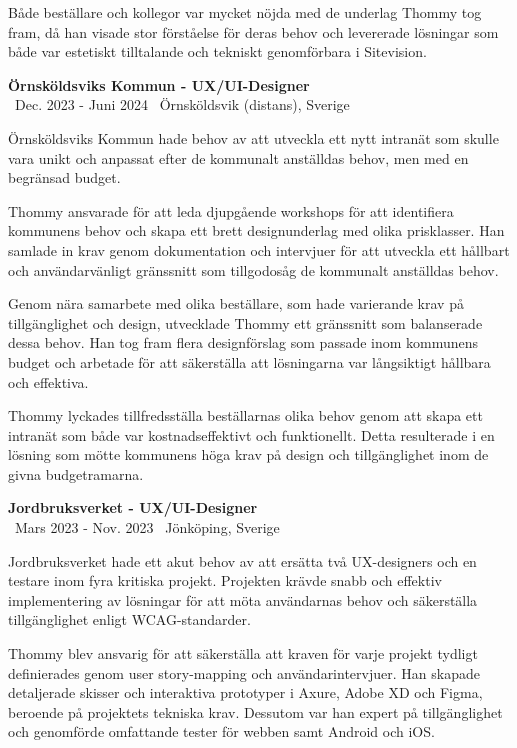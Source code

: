 \documentclass[a4paper,10pt]{article}
\begin{document}
Både beställare och kollegor var mycket nöjda med de underlag Thommy tog fram, då han visade stor förståelse för deras behov och levererade lösningar som både var estetiskt tilltalande och tekniskt genomförbara i Sitevision.

\vspace{0.5cm}
\textbf{Örnsköldsviks Kommun - UX/UI-Designer}\\
\normalsize \faCalendar \ Dec. 2023 - Juni 2024 \quad \faMapMarker \ Örnsköldsvik (distans), Sverige

Örnsköldsviks Kommun hade behov av att utveckla ett nytt intranät som skulle vara unikt och anpassat efter de kommunalt anställdas behov, men med en begränsad budget.

Thommy ansvarade för att leda djupgående workshops för att identifiera kommunens behov och skapa ett brett designunderlag med olika prisklasser. Han samlade in krav genom dokumentation och intervjuer för att utveckla ett hållbart och användarvänligt gränssnitt som tillgodosåg de kommunalt anställdas behov.

Genom nära samarbete med olika beställare, som hade varierande krav på tillgänglighet och design, utvecklade Thommy ett gränssnitt som balanserade dessa behov. Han tog fram flera designförslag som passade inom kommunens budget och arbetade för att säkerställa att lösningarna var långsiktigt hållbara och effektiva.

Thommy lyckades tillfredsställa beställarnas olika behov genom att skapa ett intranät som både var kostnadseffektivt och funktionellt. Detta resulterade i en lösning som mötte kommunens höga krav på design och tillgänglighet inom de givna budgetramarna.

\vspace{0.5cm}
\textbf{Jordbruksverket - UX/UI-Designer}\\
\normalsize \faCalendar \ Mars 2023 - Nov. 2023 \quad \faMapMarker \ Jönköping, Sverige

Jordbruksverket hade ett akut behov av att ersätta två UX-designers och en testare inom fyra kritiska projekt. Projekten krävde snabb och effektiv implementering av lösningar för att möta användarnas behov och säkerställa tillgänglighet enligt WCAG-standarder.

Thommy blev ansvarig för att säkerställa att kraven för varje projekt tydligt definierades genom user story-mapping och användarintervjuer. Han skapade detaljerade skisser och interaktiva prototyper i Axure, Adobe XD och Figma, beroende på projektets tekniska krav. Dessutom var han expert på tillgänglighet och genomförde omfattande tester för webben samt Android och iOS.
\end{document}
